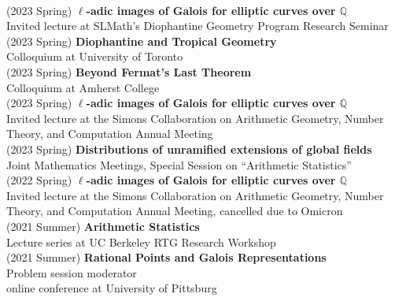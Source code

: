 \documentclass[margin,line]{res}
\begin{document}
\begin{resume}
\vspace{.05cm}\\  
(2023 Spring) \textbf{$\ell$-adic images of Galois for elliptic curves over $\mathbb{Q}$}\\
Invited lecture at SLMath's Diophantine Geometry Program Research Seminar
\vspace{.05cm}\\  
(2023 Spring) \textbf{Diophantine and Tropical Geometry}\\
Colloquium at University of Toronto
\vspace{.05cm}\\  
(2023 Spring) \textbf{Beyond Fermat's Last Theorem}\\
Colloquium at Amherst College
\vspace{.05cm}\\  
(2023 Spring) \textbf{$\ell$-adic images of Galois for elliptic curves over $\mathbb{Q}$}\\
Invited lecture at  the Simons Collaboration on Arithmetic Geometry, Number Theory, and Computation Annual Meeting
\vspace{.05cm}\\
(2023 Spring) \textbf{Distributions of unramified extensions of global fields}\\
Joint Mathematics Meetings, Special Session on ``Arithmetic Statistics''
\vspace{.05cm}\\
(2022 Spring) \textbf{$\ell$-adic images of Galois for elliptic curves over $\mathbb{Q}$}\\
Invited lecture at  the Simons Collaboration on Arithmetic Geometry, Number Theory, and Computation Annual Meeting, cancelled due to Omicron
\vspace{.05cm}\\
(2021 Summer) \textbf{Arithmetic Statistics}\\
Lecture series at UC Berkeley RTG Research Workshop
\vspace{.05cm}\\
(2021 Summer) \textbf{Rational Points and Galois Representations}\\
Problem session moderator\\ online conference at University of Pittsburg
\vspace{.05cm}\\

\end{resume}
\end{document}
